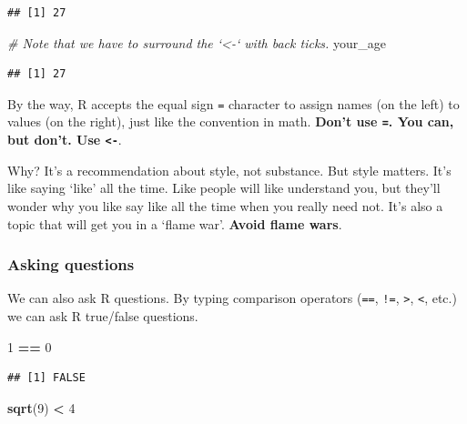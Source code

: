\documentclass[]{article}
\newenvironment{Shaded}{\begin{snugshade}}{\end{snugshade}}
\newcommand{\KeywordTok}[1]{\textcolor[rgb]{0.13,0.29,0.53}{\textbf{#1}}}
\newcommand{\DecValTok}[1]{\textcolor[rgb]{0.00,0.00,0.81}{#1}}
\newcommand{\StringTok}[1]{\textcolor[rgb]{0.31,0.60,0.02}{#1}}
\newcommand{\CommentTok}[1]{\textcolor[rgb]{0.56,0.35,0.01}{\textit{#1}}}
\newcommand{\OperatorTok}[1]{\textcolor[rgb]{0.81,0.36,0.00}{\textbf{#1}}}
\newcommand{\NormalTok}[1]{#1}
\begin{document}
\begin{verbatim}
## [1] 27
\end{verbatim}

\begin{Shaded}
\begin{Highlighting}[]
\CommentTok{# Note that we have to surround the `<-` with back ticks.}
\NormalTok{your_age}
\end{Highlighting}
\end{Shaded}

\begin{verbatim}
## [1] 27
\end{verbatim}

By the way, R accepts the equal sign \texttt{=} character to assign
names (on the left) to values (on the right), just like the convention
in math. \textbf{Don't use \texttt{=}. You can, but don't. Use
\texttt{\textless{}-}}.

Why? It's a recommendation about style, not substance. But style
matters. It's like saying `like' all the time. Like people will like
understand you, but they'll wonder why you like say like all the time
when you really need not. It's also a topic that will get you in a
`flame war'. \textbf{Avoid flame wars}.

\subsubsection{Asking questions}\label{asking-questions}

We can also ask R questions. By typing comparison operators
(\texttt{==}, \texttt{!=}, \texttt{\textgreater{}},
\texttt{\textless{}}, etc.) we can ask R true/false questions.

\begin{Shaded}
\begin{Highlighting}[]
\DecValTok{1} \OperatorTok{==}\StringTok{ }\DecValTok{0}
\end{Highlighting}
\end{Shaded}

\begin{verbatim}
## [1] FALSE
\end{verbatim}

\begin{Shaded}
\begin{Highlighting}[]
\KeywordTok{sqrt}\NormalTok{(}\DecValTok{9}\NormalTok{) }\OperatorTok{<}\StringTok{ }\DecValTok{4}
\end{Highlighting}
\end{Shaded}
\end{document}
